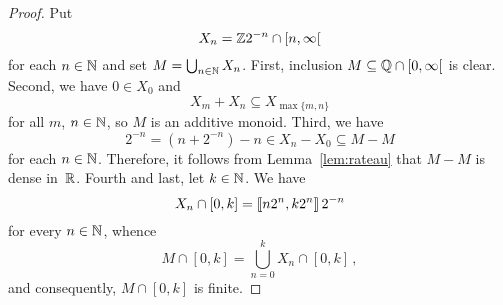 \begin{proof} 
  Put
  $$
  X_n = \mathbb{Z} 2^{-n} \cap \left[n, \infty \right[
  $$ for each $n \in \mathbb{N}$ and
  set $M = \bigcup_{n \in \mathbb{N}} X_n$.
  First, inclusion $M \subseteq \mathbb{Q} \cap \left[0, \infty\right[$ is clear.
  Second,
  we have
  $0 \in X_0$ and
  $$X_m + X_n \subseteq  X_{\max \{ m, n \}}$$ for all $m$, $n \in \mathbb{N}$,
  so $M$ is an additive monoid. 
  Third,
  we have
  $$
  2^{- n} = (n + 2^{- n}) - n  \in X_n - X_0  \subseteq  M - M
  $$
  for each $n \in \mathbb{N}$.
  Therefore, it follows from Lemma~\ref{lem:rateau} that $M - M$ is dense in~$\mathbb{R}$.
  Fourth and last, let $k \in \mathbb{N}$.
  We have
  $$X_n \cap [0, k] =  \left\llbracket n 2^n, k 2^n \right\rrbracket 2^{- n}$$
  for every $n \in \mathbb{N}$,  whence
  $$
  M \cap [0, k] = \bigcup_{n = 0}^k X_n \cap [0, k] \,, 
  $$
  and consequently, $M \cap [0, k]$ is finite.
\end{proof}